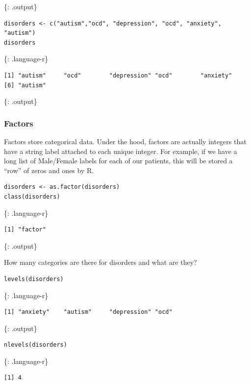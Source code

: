 \documentclass[]{article}
\begin{document}
\{: .output\}

\begin{verbatim}
disorders <- c("autism","ocd", "depression", "ocd", "anxiety", "autism")
disorders
\end{verbatim}

\{: .language-r\}

\begin{verbatim}
[1] "autism"     "ocd"        "depression" "ocd"        "anxiety"   
[6] "autism"    
\end{verbatim}

\{: .output\}

\subsubsection{Factors}\label{factors}

Factors store categorical data. Under the hood, factors are actually
integers that have a string label attached to each unique integer. For
example, if we have a long list of Male/Female labels for each of our
patients, this will be stored a ``row'' of zeros and ones by R.

\begin{verbatim}
disorders <- as.factor(disorders)
class(disorders)
\end{verbatim}

\{: .language-r\}

\begin{verbatim}
[1] "factor"
\end{verbatim}

\{: .output\}

How many categories are there for disorders and what are they?

\begin{verbatim}
levels(disorders)
\end{verbatim}

\{: .language-r\}

\begin{verbatim}
[1] "anxiety"    "autism"     "depression" "ocd"       
\end{verbatim}

\{: .output\}

\begin{verbatim}
nlevels(disorders)
\end{verbatim}

\{: .language-r\}

\begin{verbatim}
[1] 4
\end{verbatim}
\end{document}
